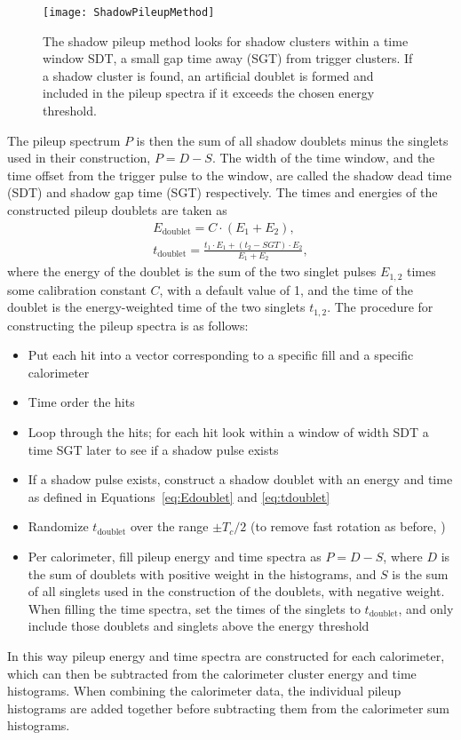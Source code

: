 \begin{figure}
    \centering
    \texttt{[image: ShadowPileupMethod]}
    \caption[Shadow pileup method]{The shadow pileup method looks for shadow clusters within a time window SDT, a small gap time away (SGT) from trigger clusters. If a shadow cluster is found, an artificial doublet is formed and included in the pileup spectra if it exceeds the chosen energy threshold.}
    \label{fig:ShadowPileupMethod}
\end{figure}

The pileup spectrum $P$ is then the sum of all shadow doublets minus the singlets used in their construction, $P = D - S$. The width of the time window, and the time offset from the trigger pulse to the window, are called the shadow dead time (SDT) and shadow gap time (SGT) respectively. The times and energies of the constructed pileup doublets are taken as
            \begin{gather}
                E_{\text{doublet}} = C \cdot (E_{1} + E_{2}), \label{eq:Edoublet} \\
                t_{\text{doublet}} = \frac{t_{1} \cdot E_{1} + (t_{2}-SGT) \cdot E_{2}}{E_{1} + E_{2}}, \label{eq:tdoublet}
            \end{gather}
where the energy of the doublet is the sum of the two singlet pulses $E_{1,2}$ times some calibration constant $C$, with a default value of 1, and the time of the doublet is the energy-weighted time of the two singlets $t_{1,2}$. The procedure for constructing the pileup spectra is as follows:
\begin{itemize}
    \item{Put each hit into a vector corresponding to a specific fill and a specific calorimeter}
    \item{Time order the hits}
    \item{Loop through the hits; for each hit look within a window of width SDT a time SGT later to see if a shadow pulse exists}
    \item{If a shadow pulse exists, construct a shadow doublet with an energy and time as defined in Equations~\ref{eq:Edoublet} and \ref{eq:tdoublet}}
    \item{Randomize $t_{\text{doublet}}$ over the range $\pm T_{c}/2$ (to remove fast rotation as before, )}
    \item{Per calorimeter, fill pileup energy and time spectra as $P = D - S$, where $D$ is the sum of doublets with positive weight in the histograms, and $S$ is the sum of all singlets used in the construction of the doublets, with negative weight. When filling the time spectra, set the times of the singlets to $t_{\text{doublet}}$, and only include those doublets and singlets above the energy threshold}
\end{itemize}
In this way pileup energy and time spectra are constructed for each calorimeter, which can then be subtracted from the calorimeter cluster energy and time histograms. When combining the calorimeter data, the individual pileup histograms are added together before subtracting them from the calorimeter sum histograms.


